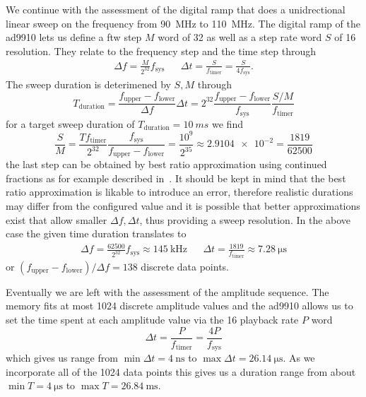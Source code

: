 We continue with the assessment of the digital ramp that does a unidrectional
linear sweep on the frequency from \SI{90}{\mega\hertz} to
\SI{110}{\mega\hertz}. The digital ramp of the \gls{ad9910} lets us define
a \gls{ftw} step $M$ word of \SI{32}{\bit} as well as a step rate word $S$ of
\SI{16}{\bit} resolution. They relate to the frequency step and the time
step through
\begin{align}
  \Delta f
  =
  \frac{M}{2^{32}}f_\text{sys}
  &&
  \Delta t
  =
  \frac{S}{f_\text{timer}}
  =
  \frac{S}{4f_\text{sys}}.
  \label{eq:elec:step}
\end{align}
The sweep duration is deterimened by $S,M$ through
\begin{equation}
  T_\text{duration}
  =
  \frac{f_\text{upper}-f_\text{lower}}{\Delta f}\Delta t
  =
  2^{32}\frac{f_\text{upper}-f_\text{lower}}
  {f_\text{sys}}\frac{S/M}{f_\text{timer}}
\end{equation}
for a target sweep duration of $T_\text{duration}=\SI{10}{ms}$ we find
\begin{equation*}
  \frac{S}{M}
  =
  \frac{T f_\text{timer}}{2^{32}}
  \frac{f_\text{sys}}{f_\text{upper}-f_\text{lower}}
  =
  \frac{10^9}{2^{35}}
  \approx
  \num{2.9104e-2}
  =
  \frac{1819}{62500}
\end{equation*}
the last step can be obtained by best ratio approximation using continued
fractions as for example described in~\cite{Ashley2003}. It should be kept in
mind that the best ratio approximation is likable to introduce an error,
therefore realistic durations may differ from the configured value and it
is possible that better approximations exist that allow smaller $\Delta f,
\Delta t$, thus providing a sweep resolution. In the above case the given
time duration translates to
\begin{align*}
  \Delta f
  =
  \frac{62500}{2^{32}}f_\text{sys}
  \approx
  \SI{145}{\kilo\hertz}
  &&
  \Delta t
  =
  \frac{1819}{f_\text{timer}}
  \approx
  \SI{7.28}{\micro\second}
\end{align*}
or $(f_\text{upper}-f_\text{lower})/\Delta f=138$ discrete data points.

Eventually we are left with the assessment of the amplitude sequence. The
memory fits at most 1024 discrete amplitude values and the \gls{ad9910}
allows us to set the time spent at each amplitude value via the \SI{16}{\bit}
playback rate $P$ word
\begin{equation}
  \Delta t
  =
  \frac{P}{f_\text{timer}}
  =
  \frac{4P}{f_\text{sys}}
\end{equation}
which gives us range from $\min\Delta t=\SI{4}{\nano\second}$ to
$\max\Delta t=\SI{26.14}{\micro\second}$. As we incorporate all of the 1024
data points this gives us a duration range from about
$\min T=\SI{4}{\micro\second}$ to $\max T=\SI{26.84}{\milli\second}$.

